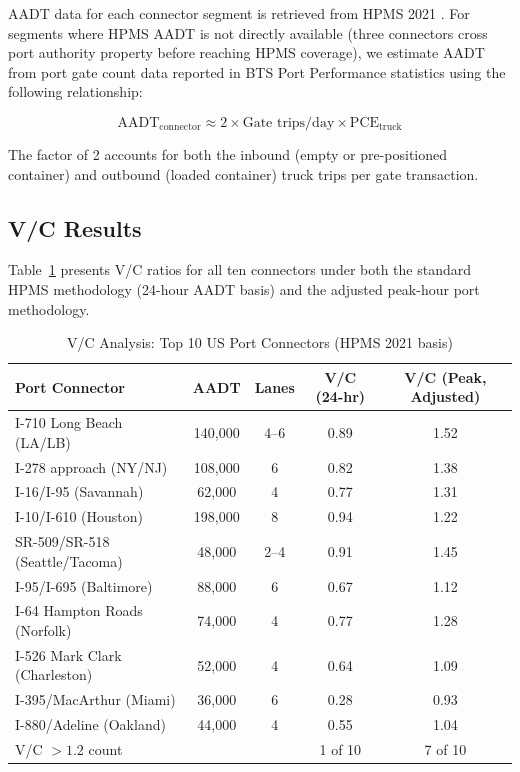 AADT data for each connector segment is retrieved from HPMS 2021 \citep{HPMS2018}. For segments where HPMS AADT is not directly available (three connectors cross port authority property before reaching HPMS coverage), we estimate AADT from port gate count data reported in BTS Port Performance statistics \citep{BTS_airfreight2023} using the following relationship:

\begin{equation}
  \text{AADT}_{\text{connector}} \approx 2 \times \text{Gate trips/day} \times \text{PCE}_{\text{truck}}
\end{equation}

The factor of 2 accounts for both the inbound (empty or pre-positioned container) and outbound (loaded container) truck trips per gate transaction.

\subsection{V/C Results}

Table~\ref{tab:vc} presents V/C ratios for all ten connectors under both the standard HPMS methodology (24-hour AADT basis) and the adjusted peak-hour port methodology.

\begin{table}[h]
\centering
\caption{V/C Analysis: Top 10 US Port Connectors (HPMS 2021 basis)}
\label{tab:vc}
\begin{tabular}{lcccc}
\toprule
Port Connector & AADT & Lanes & V/C (24-hr) & V/C (Peak, Adjusted) \\
\midrule
I-710 Long Beach (LA/LB) & 140,000 & 4--6 & 0.89 & 1.52 \\
I-278 approach (NY/NJ) & 108,000 & 6 & 0.82 & 1.38 \\
I-16/I-95 (Savannah) & 62,000 & 4 & 0.77 & 1.31 \\
I-10/I-610 (Houston) & 198,000 & 8 & 0.94 & 1.22 \\
SR-509/SR-518 (Seattle/Tacoma) & 48,000 & 2--4 & 0.91 & 1.45 \\
I-95/I-695 (Baltimore) & 88,000 & 6 & 0.67 & 1.12 \\
I-64 Hampton Roads (Norfolk) & 74,000 & 4 & 0.77 & 1.28 \\
I-526 Mark Clark (Charleston) & 52,000 & 4 & 0.64 & 1.09 \\
I-395/MacArthur (Miami) & 36,000 & 6 & 0.28 & 0.93 \\
I-880/Adeline (Oakland) & 44,000 & 4 & 0.55 & 1.04 \\
\midrule
\multicolumn{2}{l}{V/C $> 1.2$ count} & & 1 of 10 & 7 of 10 \\
\bottomrule
\end{tabular}
\end{table}


